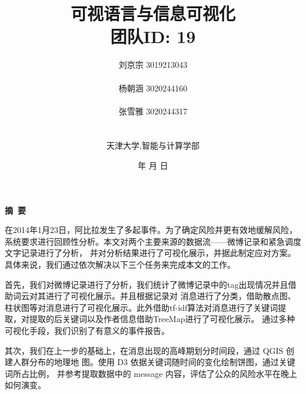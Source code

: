 \documentclass[a4paper]{article}
\begin{document}
\renewcommand{\contentsname}{目\ 录}
\renewcommand{\appendixname}{附录}
\renewcommand{\appendixpagename}{附录}
\renewcommand{\refname}{参考文献}

\renewcommand{\tablename}{表}
\renewcommand{\today}{\number\year 年 \number\month 月 \number\day 日}

\title{{\Huge 可视语言与信息可视化{\large\linebreak\\}}{\Large 团队ID: 19\linebreak}
{\Large  \linebreak\linebreak}}
\author{ \large
  刘京宗 3019213043
  \\\\
  杨朝涵 3020244160
  \\\\
  张雪雅 3020244317
  \\\\\\
  天津大学,智能与计算学部}
\date{\today}
\maketitle
\newpage

\begin{center}
  \tableofcontents\label{c}
\end{center}
\newpage


\begin{center}
  {\Large\bf{摘\ 要\\}}
\end{center}

在2014年1月23日，阿比拉发生了多起事件。为了确定风险并更有效地缓解风险，系统要求进行回顾性分析。本文对两个主要来源的数据流——微博记录和紧急调度文字记录进行了分析，
并对分析结果进行了可视化展示，并据此制定应对方案。具体来说，我们通过依次解决以下三个任务来完成本文的工作。

首先，我们对微博记录进行了分析，我们统计了微博记录中的tag出现情况并且借助词云对其进行了可视化展示。并且根据记录对
消息进行了分类，借助散点图、柱状图等对消息进行了可视化展示。此外借助tf-idf算法对消息进行了关键词提取，对提取的后关键词以及作者信息借助TreeMap进行了可视化展示。
通过多种可视化手段，我们识别了有意义的事件报告。

其次，我们在上一步的基础上，在消息出现的高峰期划分时间段，通过 QGIS 创建人群分布的地理地
图。使用 D3 依据关键词随时间的变化绘制饼图，通过关键词所占比例，
并参考提取数据中的 message 内容，评估了公众的风险水平在晚上如何演变。
\end{document}
